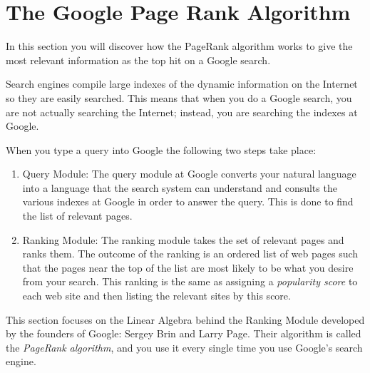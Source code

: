 % 



\section{The Google Page Rank Algorithm}
In this section you will discover how the PageRank algorithm works to give the most relevant
information as the top hit on a Google search.  

Search engines compile large indexes of the dynamic information on the Internet so they
are easily searched.  This means that when you do a Google search, you are not actually
searching the Internet; instead, you are searching the indexes at Google.

When you type a query into Google the following two steps take place:
\begin{enumerate}
    \item Query Module: The query module at Google converts your natural language into a
        language that the search system can understand and consults the various indexes
        at Google in order to answer the query.  This is done to find the list of relevant
        pages.
    \item Ranking Module: The ranking module takes the set of relevant pages and ranks
        them. The outcome of the ranking is an ordered list of web pages such
        that the pages near the top of the list are most likely to be what you desire from
        your search. This ranking is the same as assigning a {\it popularity score} to
        each web site and then listing the relevant sites by this score.  
\end{enumerate}

This section focuses on the Linear Algebra behind the Ranking Module developed by the
founders of Google: Sergey Brin and Larry Page.  Their algorithm is called the
\emph{PageRank algorithm}, and you use it every single time you use Google's search
engine.



